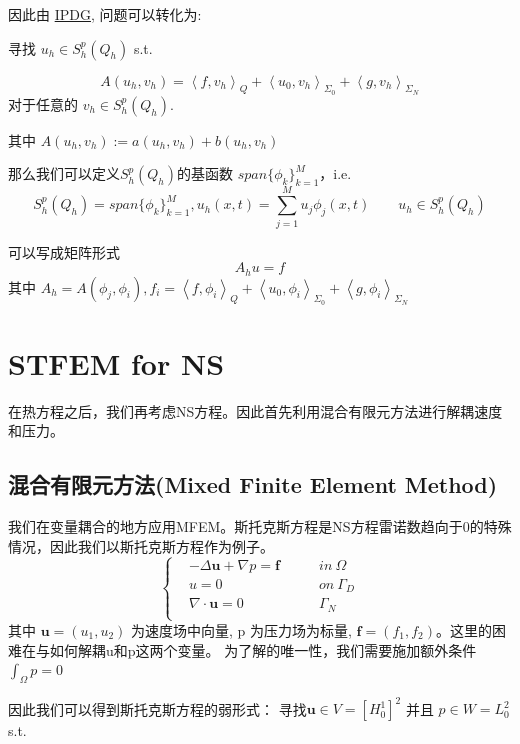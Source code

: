 因此由 \hyperref[Interior Penalty Discontinuous Galerkin Method]{IPDG}, 问题可以转化为: 

\begin{tcolorbox}
寻找 $u_h\in S_h^p(Q_h)$ s.t.

$$A\left(u_{h}, v_{h}\right)=\left\langle f, v_{h}\right\rangle_{Q}+\left\langle u_{0}, v_{h}\right\rangle_{\Sigma_{0}}+\left\langle g, v_{h}\right\rangle_{\Sigma_{N}}$$
对于任意的  $v_{h} \in S_{h}^{p}\left(Q_h\right) $.

其中
$A\left(u_{h}, v_{h}\right):=a\left(u_{h}, v_{h}\right)+b\left(u_{h}, v_{h}\right)$
\end{tcolorbox}


那么我们可以定义$S_h^p(Q_h)$的基函数 $span\{\phi_k\}_{k=1}^M$，i.e.
$$S_h^p(Q_h)=span\{\phi_k\}_{k=1}^M,u_h(x,t)=\sum_{j=1}^{M}u_j\phi_j(x,t)\qquad u_h\in S_h^p(Q_h)$$


可以写成矩阵形式 $$A_hu=f$$ 其中 $A_h=A(\phi_j,\phi_i),f_i=\left\langle f, \phi_i\right\rangle_{Q}+\left\langle u_{0}, \phi_i\right\rangle_{\Sigma_{0}}+\left\langle g, \phi_i\right\rangle_{\Sigma_{N}}$

\section{STFEM for NS}

在热方程之后，我们再考虑NS方程。因此首先利用混合有限元方法进行解耦速度和压力。

\subsection{混合有限元方法(Mixed Finite Element Method)}
我们在变量耦合的地方应用MFEM。斯托克斯方程是NS方程雷诺数趋向于0的特殊情况，因此我们以斯托克斯方程作为例子。
$$\left\{
\begin{aligned}
    &-\Delta \textbf{u}+\nabla p = \textbf{f} \qquad &in\ \Omega\\
    &u=0\qquad &on \ \Gamma_D\\
    &\nabla \cdot \textbf{u} = 0\qquad &\Gamma_N\\
\end{aligned}
\right.$$
其中 $\textbf{u}=(u_1,u_2)$ 为速度场中向量, p 为压力场为标量, $\textbf{f}=(f_1, f_2)$。这里的困难在与如何解耦u和p这两个变量。
为了解的唯一性，我们需要施加额外条件 $\int_\Omega p=0$

因此我们可以得到斯托克斯方程的弱形式： 寻找$\textbf{u}\in V=[H^1_0]^2$ 并且 $p\in W=L^2_0$ s.t.


